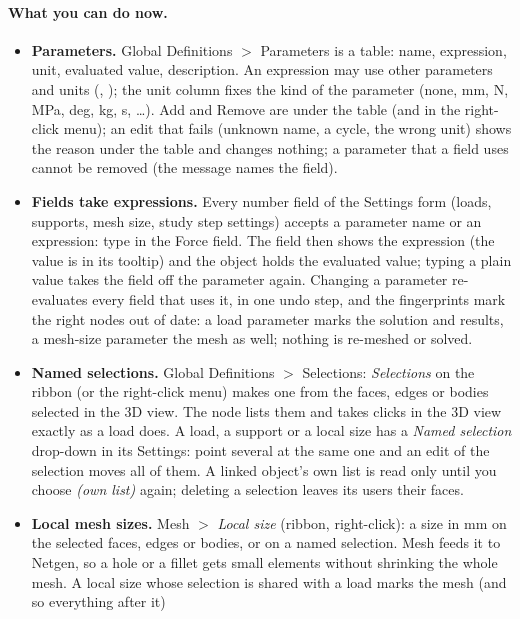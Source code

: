\paragraph{What you can do now.}
\begin{itemize}[nosep]
  \item \textbf{Parameters.} Global Definitions $>$ Parameters is a table: name, expression, unit, evaluated value,
        description. An expression may use other parameters and units (, ); the unit
        column fixes the kind of the parameter (none, mm, N, MPa, deg, kg, s, \dots). Add and Remove are under the table
        (and in the right-click menu); an edit that fails (unknown name, a cycle, the wrong unit) shows the reason under the
        table and changes nothing; a parameter that a field uses cannot be removed (the message names the field).
  \item \textbf{Fields take expressions.} Every number field of the Settings form (loads, supports, mesh size, study
        step settings) accepts a parameter name or an expression: type  in the
        Force field. The field then shows the expression (the value is in its tooltip) and the object holds the evaluated
        value; typing a plain value takes the field off the parameter again. Changing a parameter re-evaluates every field
        that uses it, in one undo step, and the fingerprints mark the right nodes out of date: a load parameter marks the
        solution and results, a mesh-size parameter the mesh as well; nothing is re-meshed or solved.
  \item \textbf{Named selections.} Global Definitions $>$ Selections: \emph{Selections} on the ribbon (or the right-click
        menu) makes one from the faces, edges or bodies selected in the 3D view. The node lists them and takes clicks in the
        3D view exactly as a load does. A load, a support or a local size has a \emph{Named selection} drop-down in its
        Settings: point several at the same one and an edit of the selection moves all of them. A linked object's own list is
        read only until you choose \emph{(own list)} again; deleting a selection leaves its users their faces.
  \item \textbf{Local mesh sizes.} Mesh $>$ \emph{Local size} (ribbon, right-click): a size in mm on the selected faces, edges
        or bodies, or on a named selection. Mesh feeds it to Netgen, so a hole or a fillet gets small elements without
        shrinking the whole mesh. A local size whose selection is shared with a load marks the mesh (and so everything after it)

\end{itemize}
